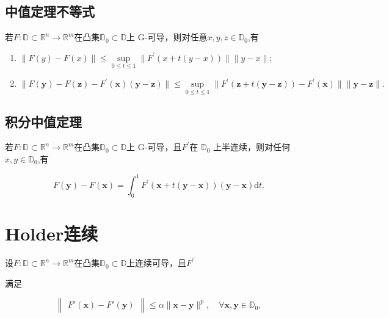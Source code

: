 \documentclass{lzureport}
\begin{document}
\subsection{中值定理不等式}
若$F:\mathbb{D}\subset\mathbb{R}^n\to\mathbb{R}^m$在凸集$\mathbb{D}_0\subset\mathbb{D}$上 G-可导，则对任意$x,y,z\in\mathbb{D}_0$,有

\begin{enumerate}[label=\arabic*)]
	\item $\| F( y) - F( x) \| \leqslant \sup\limits _{0\leqslant t\leqslant 1}\| F^{\prime }( x+ t( y- x) ) \| \| y- x\| ;$
	\item $\| F( \mathbf{y} ) - F( \mathbf{z} ) - F^{\prime }( \mathbf{x} ) ( \mathbf{y} - \mathbf{z} ) \| \leqslant \sup\limits _{0\leq t\leq 1}\| F^{\prime }( \mathbf{z} + t\left ( \mathbf{y} - \boldsymbol{z}\right ) ) - F^{\prime }( \mathbf{x} ) \| \| \mathbf{y} - \boldsymbol{z}\| .$ 
\end{enumerate}

\subsection{积分中值定理}
若$F:\mathbb{D}\subset\mathbb{R}^n\to\mathbb{R}^m$在凸集$\mathbb{D}_0\subset\mathbb{D}$上 G-可导，且$F^\prime$在
$\mathbb{D}_0$ 上半连续，则对任何 $x,y\in\mathbb{D}_0$,有

\begin{equation}
F(\mathbf{y})-F(\mathbf{x})=\int_0^1F^{\prime}(\mathbf{x}+t(\mathbf{y}-\mathbf{x}))(\mathbf{y}-\mathbf{x})\mathrm{d}t.
\end{equation}\label{eqn:积分中值定理}





\section{Holder连续}
设$F:\mathbb{D}\subset\mathbb{R}^n\to\mathbb{R}^m$在凸集$\mathbb{D}_0\subset\mathbb{D}$上连续可导，且$F^\prime$

满足

\begin{equation}
\begin{Vmatrix}F'(\boldsymbol{x})-F'(\boldsymbol{y})\end{Vmatrix}\leqslant\alpha\|\boldsymbol{x}-\boldsymbol{y}\|^p,\quad\forall\boldsymbol{x},\boldsymbol{y}\in\mathbb{D}_0,
\end{equation}\label{eqn:Holder连续}
\end{document}
